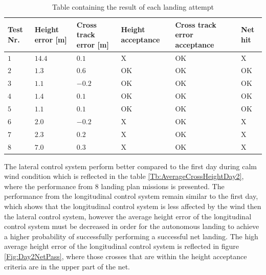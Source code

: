 \begin{table}[H]
\centering
\begin{tabular}{| p{0.5cm} | p{1cm} | p{1cm} | p{3.5cm} | p{3cm} | p{1cm} |}
\hline
\textbf{Test Nr.}	& \textbf{Height error [m]}	& \textbf{Cross track error [m]}& \textbf{Height acceptance}& \textbf{Cross track error acceptance}	& \textbf{Net hit}\\ \hline
$1$				& $14.4$		& $0.1$		& X								& OK									& X					\\ \hline
$2$				& $1.3$		& $0.6$	& OK								& OK										& OK					\\ \hline
$3$				& $1.1$		& $-0.2$	& OK							& OK									& OK				\\ \hline
$4$				& $1.4$		& $0.1$		& OK							& OK										& OK					\\ \hline
$5$				& $1.1$		& $0.1$		& OK							& OK										& OK					\\ \hline
$6$				& $2.0$		& $-0.2$	& X								& OK									& X					\\ \hline
$7$				& $2.3$		& $0.2$		& X								& OK									& X				\\ \hline
$8$				& $7.0$	& $0.3$			& X										& OK										& X					\\ \hline
\end{tabular}
\caption{Table containing the result of each landing attempt}
\label{tb:Day2LandingAttempt}
\end{table}
The lateral control system perform better compared to the first day during calm wind condition which is reflected in the table \ref{Tb:AverageCrossHeightDay2}, where the performance from 8 landing plan missions is presented. The performance from the longitudinal control system remain similar to the first day, which shows that the longitudinal control system is less affected by the wind then the lateral control system, however the average height error of the longitudinal control system must be decreased in order for the autonomous landing to achieve a higher probability of successfully performing a successful net landing. The high average height error of the longitudinal control system is reflected in figure \ref{Fig:Day2NetPass}, where those crosses that are within the height acceptance criteria are in the upper part of the net.
